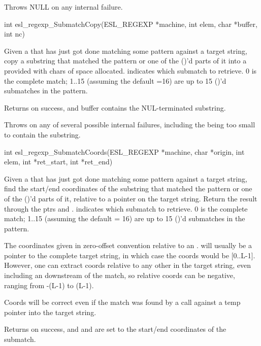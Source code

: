 \begin{sreapi}
Throws NULL on any internal failure.


\hypertarget{func:esl_regexp_SubmatchCopy()}
{\item[int esl\_regexp\_SubmatchCopy(ESL\_REGEXP *machine, int elem, char *buffer, int nc)]}

Given a  that has just got done matching some
pattern against a target string, copy a substring that
matched the pattern or one of the ()'d parts of it into
a provided  with  chars of space allocated.
 indicates which submatch to retrieve.  0 is
the complete match; 1..15 (assuming the default
=16) are up to 15 ()'d submatches in
the pattern.

Returns  on success, and buffer contains the NUL-terminated
substring. 

Throws  on any of several possible internal failures,
including the  being too small to contain the 
substring.


\hypertarget{func:esl_regexp_SubmatchCoords()}
{\item[int esl\_regexp\_SubmatchCoords(ESL\_REGEXP *machine, char *origin, int elem, 
			  int *ret\_start, int *ret\_end)]}

Given a  that has just got done matching some
pattern against a target string, find the start/end
coordinates of the substring that matched the
pattern or one of the ()'d parts of it, relative to
a pointer  on the target string. Return the result
through the ptrs  and .  
indicates which submatch to retrieve.  0 is the
complete match; 1..15 (assuming the default
 = 16) are up to 15 ()'d submatches in
the pattern.

The coordinates given in zero-offset convention relative
to an .  will usually be a pointer to
the complete target string, in which case the coords
would be [0..L-1]. However, one can extract coords
relative to any other  in the target string,
even including an  downstream of the match, so
relative coords can be negative, ranging from -(L-1) to
(L-1).

Coords will be correct even if the match was
found by a  call against
a temp pointer into the target string.

Returns  on success, and  and 
are set to the start/end coordinates of the submatch.


\end{sreapi}
